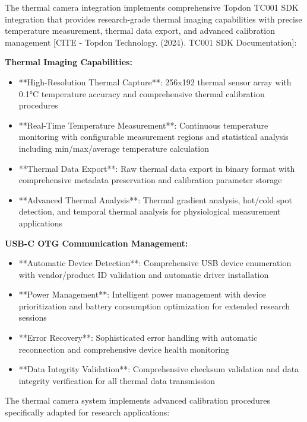 \documentclass[12pt,a4paper]{report}
\begin{document}
The thermal camera integration implements comprehensive Topdon TC001 SDK integration that provides research-grade
thermal imaging capabilities with precise temperature measurement, thermal data export, and advanced calibration
management [CITE - Topdon Technology. (2024). TC001 SDK Documentation]:

\textbf{Thermal Imaging Capabilities:}

\begin{itemize}
\item **High-Resolution Thermal Capture**: 256x192 thermal sensor array with 0.1°C temperature accuracy and comprehensive
  thermal calibration procedures
\item **Real-Time Temperature Measurement**: Continuous temperature monitoring with configurable measurement regions and
  statistical analysis including min/max/average temperature calculation
\item **Thermal Data Export**: Raw thermal data export in binary format with comprehensive metadata preservation and
  calibration parameter storage
\item **Advanced Thermal Analysis**: Thermal gradient analysis, hot/cold spot detection, and temporal thermal analysis for
  physiological measurement applications

\end{itemize}
\textbf{USB-C OTG Communication Management:}

\begin{itemize}
\item **Automatic Device Detection**: Comprehensive USB device enumeration with vendor/product ID validation and automatic
  driver installation
\item **Power Management**: Intelligent power management with device prioritization and battery consumption optimization for
  extended research sessions
\item **Error Recovery**: Sophisticated error handling with automatic reconnection and comprehensive device health
  monitoring
\item **Data Integrity Validation**: Comprehensive checksum validation and data integrity verification for all thermal data
  transmission

\end{itemize}
The thermal camera system implements advanced calibration procedures specifically adapted for research applications:
\end{document}
